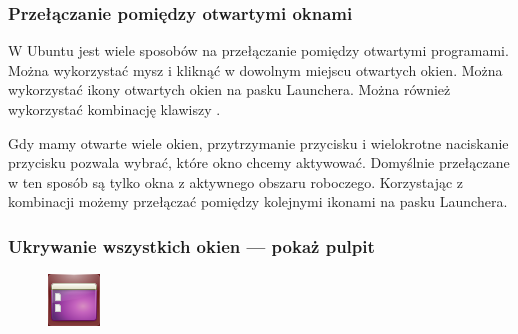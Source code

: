 \subsubsection{Przełączanie pomiędzy otwartymi oknami}
W Ubuntu jest wiele sposobów na przełączanie pomiędzy otwartymi programami. Można wykorzystać mysz i kliknąć w dowolnym miejscu otwartych okien. Można wykorzystać ikony otwartych okien na pasku Launchera. Można również wykorzystać kombinację klawiszy .

Gdy mamy otwarte wiele okien, przytrzymanie przycisku  i wielokrotne naciskanie przycisku  pozwala wybrać, które okno chcemy aktywować. Domyślnie przełączane w ten sposób są tylko okna z aktywnego obszaru roboczego. Korzystając z kombinacji  możemy przełączać pomiędzy kolejnymi ikonami na pasku Launchera.

\subsubsection{Ukrywanie wszystkich okien --- pokaż pulpit}
\begin{figure}
	\vspace{-10pt}	
	\includegraphics[width=\linewidth]{images/ikony_pokaz_pulpit.png}
\end{figure}

